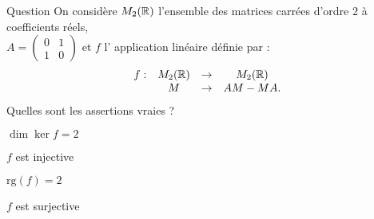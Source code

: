 \begin{multi}[multiple,feedback=
{On vérifie que pour \(M=\left(\begin{array}{rc}
a&b\\c&d\\ \end{array}\right) \), \(f(M)=\left(\begin{array}{rc}
c-b&d-a\\a-d&b-c\\ \end{array}\right)\). Par conséquent,
\(\ker f = \left\{ \left(\begin{array}{rc}
a&b\\b&a\\ \end{array}\right) \; ; \; a,b \in \Rr \right \}\) et 
\(\Im f = \left\{ \left(\begin{array}{rc}
\alpha&\beta\\-\beta&-\alpha\\ 
\end{array}\right) \; ; \; \alpha, \beta \in \Rr  \right \}\). On  déduit que \(\dim \ker f = 2\),  \(\mbox{rg} (f)=\dim \Im f = 2\) et que \(f\) n'est ni injective, ni surjective.
}]{Question}
On considère \(M_2(\mathbb{R})\) l'ensemble des matrices carrées d'ordre \(2\) à coefficients réels,  \\
\( A= \left(\begin{array}{rcc}0&1\\1&0 \end{array}\right)\) et 
\(f\) l' application linéaire définie par : 
\[\begin{array}{rccc}f:&M_2(\mathbb{R})&\to&M_2(\mathbb{R})\\
& M&\to &AM-MA.  \end{array}\]
Quelles sont les assertions vraies ?

    \item* \(\dim \ker f =2\)
    \item \(f\) est injective
    \item* \(\mbox{rg} (f) =2\)
    \item \(f\) est surjective
\end{multi}


